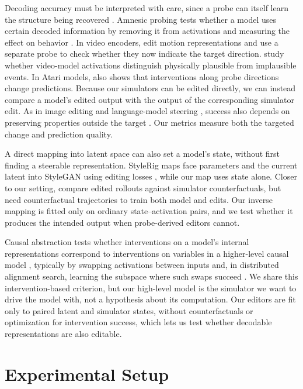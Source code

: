 \documentclass{article} %
\begin{document}
Decoding accuracy must be interpreted with care, since a probe can itself learn the structure being recovered \citep{hewitt2019probes}. Amnesic probing tests whether a model uses certain decoded information by removing it from activations and measuring the effect on behavior \citep{elazar2021amnesic}. In video encoders, \citet{joseph2026physics} edit motion representations and use a separate probe to check whether they now indicate the target direction. \citet{esmati2026invisible} study whether video-model activations distinguish physically plausible from implausible events. In Atari models, \citet{zhang2026probing} also shows that interventions along probe directions change predictions. Because our simulators can be edited directly, we can instead compare a model's edited output with the output of the corresponding simulator edit. As in image editing \citep{shen2020interfacegan} and language-model steering \citep{zou2023repe,rimsky2024caa}, success also depends on preserving properties outside the target \citep{canby2025reliable}. Our metrics measure both the targeted change and prediction quality.

A direct mapping into latent space can also set a model's state, without first finding a steerable representation. StyleRig maps face parameters and the current latent into StyleGAN using editing losses \citep{tewari2020stylerig}, while our map uses state alone. Closer to our setting, \citet{liu2026carriers} compare edited rollouts against simulator counterfactuals, but need counterfactual trajectories to train both model and edits. Our inverse mapping is fitted only on ordinary state--activation pairs, and we test whether it produces the intended output when probe-derived editors cannot.

Causal abstraction tests whether interventions on a model's internal representations correspond to interventions on variables in a higher-level causal model \citep{geiger2021causal}, typically by swapping activations between inputs and, in distributed alignment search, learning the subspace where such swaps succeed \citep{geiger2025foundation,geiger2024das}. We share this intervention-based criterion, but our high-level model is the simulator we want to drive the model with, not a hypothesis about its computation. Our editors are fit only to paired latent and simulator states, without counterfactuals or optimization for intervention success, which lets us test whether decodable representations are also editable.


\section{Experimental Setup}
\label{sec:experimental_setup}
\end{document}
